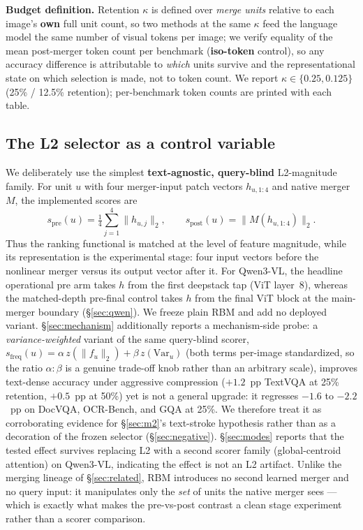 \documentclass[sigconf,nonacm]{acmart}
\begin{document}
\textbf{Budget definition.} Retention $\kappa$ is defined over \emph{merge
units} relative to each image's \textbf{own} full unit count, so two methods at
the same $\kappa$ feed the language model the same number of visual tokens per
image; we verify equality of the mean post-merger token count per benchmark
(\textbf{iso-token} control), so any accuracy difference is attributable to
\emph{which} units survive and the representational state on which selection is
made, not to token count. We report $\kappa \in \{0.25, 0.125\}$ (25\% / 12.5\%
retention); per-benchmark token counts are printed with each table.

\subsection{The L2 selector as a control variable}\label{sec:selector}

We deliberately use the simplest \textbf{text-agnostic, query-blind}
L2-magnitude family. For unit $u$ with four merger-input patch vectors
$h_{u,1:4}$ and native merger $M$, the implemented scores are
\[
s_{\mathrm{pre}}(u)=\tfrac14\sum_{j=1}^{4}\|h_{u,j}\|_2,
\qquad
s_{\mathrm{post}}(u)=\|M(h_{u,1:4})\|_2.
\]
Thus the ranking functional is matched at the level of feature magnitude,
while its representation is the experimental stage: four input vectors before
the nonlinear merger versus its output vector after it. For Qwen3-VL, the
headline operational pre arm takes $h$ from the first deepstack tap (ViT
layer~8), whereas the matched-depth pre-final control takes $h$ from the final
ViT block at the main-merger boundary (\S\ref{sec:qwen}). We freeze plain RBM
and add no deployed variant. \S\ref{sec:mechanism} additionally
reports a mechanism-side probe: a \emph{variance-weighted} variant of the same
query-blind scorer, $s_{\text{freq}}(u) = \alpha\,z{}\!\left(\|f_u\|_2\right) +
\beta\,z{}\!\left(\mathrm{Var}_{u}\right)$ (both terms per-image standardized,
so the ratio $\alpha{:}\beta$ is a genuine trade-off knob rather than an
arbitrary scale), improves text-dense accuracy under aggressive compression
($+1.2$~pp TextVQA at 25\% retention, $+0.5$~pp at 50\%) yet is not a general
upgrade: it regresses $-1.6$ to $-2.2$~pp on DocVQA, OCR-Bench, and GQA at 25\%.
We therefore treat it as corroborating evidence for \S\ref{sec:m2}'s text-stroke
hypothesis rather than as a decoration of the frozen selector
(\S\ref{sec:negative}). \S\ref{sec:modes} reports that the tested effect
survives replacing L2 with a second scorer family (global-centroid attention) on
Qwen3-VL, indicating the effect is not an L2 artifact. Unlike the merging
lineage of \S\ref{sec:related}, RBM introduces no second learned merger and no
query input: it manipulates only the \emph{set} of units the native merger sees
--- which is exactly what makes the pre-vs-post contrast a clean stage
experiment rather than a scorer comparison.
\end{document}
